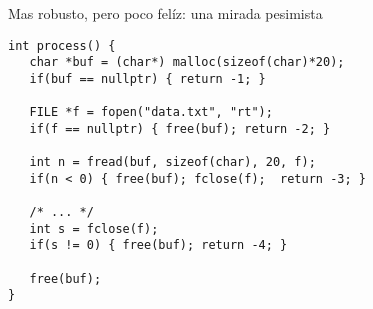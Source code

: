 \begin{frame}[fragile]{Mas robusto, pero poco fel\'iz: una mirada pesimista}
   \begin{lstlisting}[style=normal]
int process() {
   char *buf = (char*) malloc(sizeof(char)*20);
   if(buf == nullptr) { return -1; }

   FILE *f = fopen("data.txt", "rt");
   if(f == nullptr) { free(buf); return -2; } 

   int n = fread(buf, sizeof(char), 20, f);
   if(n < 0) { free(buf); fclose(f);  return -3; }

   /* ... */
   int s = fclose(f);
   if(s != 0) { free(buf); return -4; }

   free(buf);
}
   \end{lstlisting}
\end{frame}

